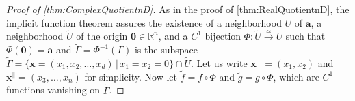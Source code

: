 \documentclass{article}
\newcommand{\Albert}[1]{{\color[rgb]{0.2,0.4,0.8}\textbf{Albert: } #1}}
\theoremstyle{theorem}
\theoremstyle{definition}
\def\RR{\mathbb{R}}
\def\ba{\mathbf{a}}
\def\bx{\mathbf{x}}
\def\bzero{\mathbf{0}}
\begin{document}
\begin{proof}[Proof of \autoref{thm:ComplexQuotientnD}]

    
    As in the proof of \autoref{thm:RealQuotientnD}, the implicit function theorem assures the existence of a neighborhood \(U\) of \(\ba\), a neighborhood \(\tilde U\) of the origin \(\bzero\in\RR^n\), and a \(C^1\) bijection \(\Phi\colon\tilde U\xrightarrow{\simeq} U\) such that \(\Phi(\bzero) = \ba\) and \(\tilde\Gamma = \Phi^{-1}(\Gamma)\) is the subspace \(\tilde\Gamma = \{\bx=(x_1,x_2,\ldots,x_d)\,|\,  x_1=x_2=0\}\cap\tilde U\). Let us write $\bx^\perp=(x_1,x_2)$ and $\bx^\parallel=(x_3,\ldots,x_n)$ for simplicity.
    Now let \(\tilde f = f\circ\Phi\) and \(\tilde g = g\circ\Phi\), which are \(C^1\) functions vanishing on \(\tilde\Gamma\).


\end{proof}
\end{document}
